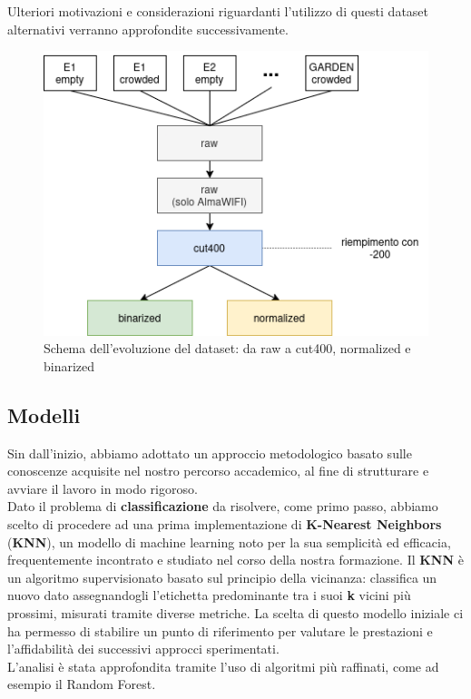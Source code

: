 \documentclass{article}
\begin{document}
Ulteriori motivazioni e considerazioni riguardanti l'utilizzo di questi dataset alternativi verranno approfondite successivamente.

\begin{figure}[ht!]
    \centering
    \includegraphics[width=0.5\linewidth]{img/datasetHistory.png}
    \caption{Schema dell’evoluzione del dataset: da raw a cut400, normalized e binarized}
    \label{fig:datasetHistory}
\end{figure}



\subsection{Modelli}
Sin dall'inizio, abbiamo adottato un approccio metodologico basato sulle conoscenze acquisite nel nostro percorso accademico, al fine di strutturare e avviare il lavoro in modo rigoroso. \\

Dato il problema di \textbf{classificazione} da risolvere, come primo passo, abbiamo scelto di procedere ad una prima implementazione di \textbf{K-Nearest Neighbors} (\textbf{KNN}), un modello di machine learning noto per la sua semplicità ed efficacia, frequentemente incontrato e studiato nel corso della nostra formazione.
Il \textbf{KNN} è un algoritmo supervisionato basato sul principio della vicinanza: classifica un nuovo dato assegnandogli l'etichetta predominante tra i suoi \textbf{k} vicini più prossimi, misurati tramite diverse metriche. La scelta di questo modello iniziale ci ha permesso di stabilire un punto di riferimento per valutare le prestazioni e l'affidabilità dei successivi approcci sperimentati.\\
L'analisi è stata approfondita tramite l’uso di algoritmi più raffinati, come ad esempio il Random Forest. \\
\end{document}
